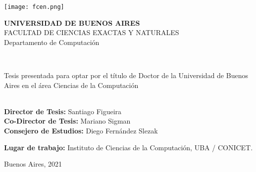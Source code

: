 \thispagestyle{empty}
\begin{center}
    \texttt{[image: fcen.png]}\\
    \vspace{0.5cm}
    \begin{large}
        \textbf{UNIVERSIDAD DE BUENOS AIRES}\\
        \vspace{0.3cm}
        FACULTAD DE CIENCIAS EXACTAS Y NATURALES\\
        \vspace{0.3cm}
        Departamento de Computación\\
        \vspace{1cm}
    \end{large}
    \begin{large}
        \textbf{\newtitle}\\
        \vspace{1cm}
    \end{large}
    \begin{large}
Tesis presentada para optar por el título de Doctor de la Universidad de Buenos
Aires en el área Ciencias de la Computación\\
        \vspace{1cm}
        \textbf{\MakeUppercase{\newauthor}}\\
        \vspace{1cm}
    \end{large}
\end{center}
\noindent
    \textbf{Director de Tesis:} Santiago Figueira\\ %
    \textbf{Co-Director de Tesis:} Mariano Sigman\\ %
    \textbf{Consejero de Estudios:} Diego Fernández Slezak

\noindent
    \textbf{Lugar de trabajo:} Instituto de Ciencias de la Computación, UBA / CONICET.

\noindent
    Buenos Aires, 2021 %
        
